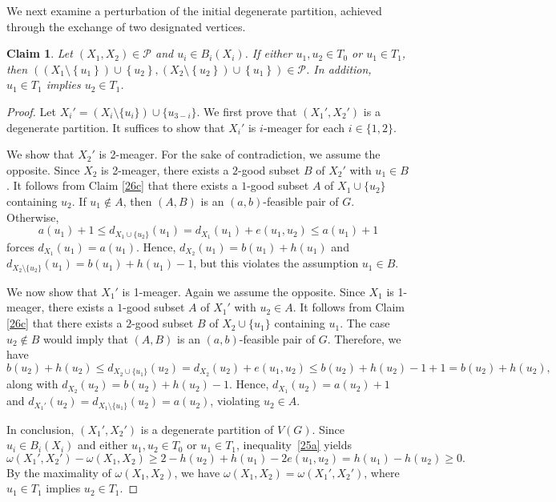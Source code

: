 \documentclass[11p]{elsarticle}
\newtheorem{claim}[theorem]{Claim}
\theoremstyle{definition}
\begin{document}
We next examine a perturbation of the initial degenerate partition, achieved through the exchange of two designated vertices.



	\begin{claim}\label{25c}
		Let $ (X_1,X_2)\in\mathcal{P} $ and  $ u_i\in B_i(X_i) $. If either $ u_1,u_2\in T_0$ or $u_1\in T_1$, then $ ((X_1\setminus\left\lbrace u_1\right\rbrace )\cup\left\lbrace u_2\right\rbrace,(X_2\setminus\left\lbrace u_2\right\rbrace )\cup\left\lbrace u_1\right\rbrace )\in\mathcal{P} $. In addition, $u_1\in T_1$ implies  $u_2\in T_1$.
	\end{claim}
	 \begin{proof}
	 	 Let $ X_i'=(X_i\setminus\{u_i\})\cup\{u_{3-i}\} $.  We first prove that $ (X_1',X_2') $ is a degenerate partition. It suffices to show that $ X_i' $ is $i$-meager for each $ i\in\{1,2\} $.

We  show that $ X_2' $ is 2-meager. For the sake of contradiction, we assume the opposite.
 Since $ X_2 $ is 2-meager, there exists a  $ 2$-good subset $ B $ of $ X_2' $ with $ u_{1}\in B $.   It follows from Claim \ref{26c} that there {exists} a $ 1 $-good subset $ A $ of  $ X_1\cup\{u_2\} $ containing $ u_2 $.  If $ u_1\notin A $, then $ (A,B) $ is an $ (a,b) $-feasible pair of $ G $. Otherwise, $$ a(u_1)+1\le d_{X_1\cup\{u_2\}}(u_1)=d_{X_1}(u_1)+e(u_1,u_2)\le a(u_1)+1$$ forces  $ d_{X_1}(u_1)=a(u_1) $. Hence, $ d_{X_2}(u_1)=b(u_1)+h(u_1) $ and $ d_{X_2\setminus\{u_2\}}(u_1)=b(u_1)+h(u_1)-1 $, but this violates the assumption $ u_1\in B $.
	 	
 We now show that $ X_1' $ is 1-meager. Again we assume the opposite. Since $ X_1 $ is 1-meager, there exists a  $ 1$-good subset $ A $ of $ X_1' $ with $ u_{2}\in A $.   It follows from Claim \ref{26c} that there {exists} a $ 2 $-good subset $ B $ of  $ X_2\cup\{u_1\} $ containing $ u_1 $.  The case $ u_2\notin B $ would imply that $ (A,B) $ {is an $ (a,b) $-feasible pair of $ G $}. Therefore, we have $$ b(u_2)+h(u_2)\le d_{X_2\cup\{u_1\}}(u_2)=d_{X_2}(u_2)+e(u_1,u_2)\le b(u_2)+h(u_2)-1+1=b(u_2)+h(u_2),$$ along with $ d_{X_2}(u_2)=b(u_2)+h(u_2)-1 $. Hence, $ d_{X_1}(u_2)=a(u_2)+1 $ and $ d_{X_1'}(u_2)=d_{X_1\setminus\{u_1\}}(u_2)=a(u_2) $, violating $ u_2\in A $. 
 
 In conclusion, $ (X_1',X_2') $ is a degenerate partition of $ V(G) $. Since $u_i \in B_i(X_i)$ and either $u_1, u_2 \in T_0$ or $u_1 \in T_1$, inequality~\eqref{25a} yields
  $$ \omega(X_1',X_2')- \omega(X_1,X_2)\ge2-h(u_2)+h(u_1)-2e(u_1,u_2)=h(u_1)-h(u_2)\ge 0.$$   By the maximality of $ \omega(X_1,X_2) $, we have  $ \omega(X_1,X_2)= \omega(X_1',X_2')  $, where  $u_1\in T_1$ implies $u_2\in T_1$.
	 \end{proof}
\end{document}

